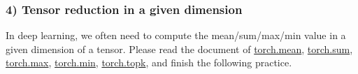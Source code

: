 \documentclass[11pt]{article}
\begin{document}
    \hypertarget{tensor-reduction-in-a-given-dimension}{%
\subsubsection{4) Tensor reduction in a given
dimension}\label{tensor-reduction-in-a-given-dimension}}

    In deep learning, we often need to compute the mean/sum/max/min value in
a given dimension of a tensor. Please read the document of
\href{https://pytorch.org/docs/stable/torch.html\#torch.mean}{torch.mean},
\href{https://pytorch.org/docs/stable/torch.html\#torch.sum}{torch.sum},
\href{https://pytorch.org/docs/stable/torch.html\#torch.max}{torch.max},
\href{https://pytorch.org/docs/stable/torch.html\#torch.min}{torch.min},
\href{https://pytorch.org/docs/stable/torch.html\#torch.topk}{torch.topk},
and finish the following practice.
\end{document}
